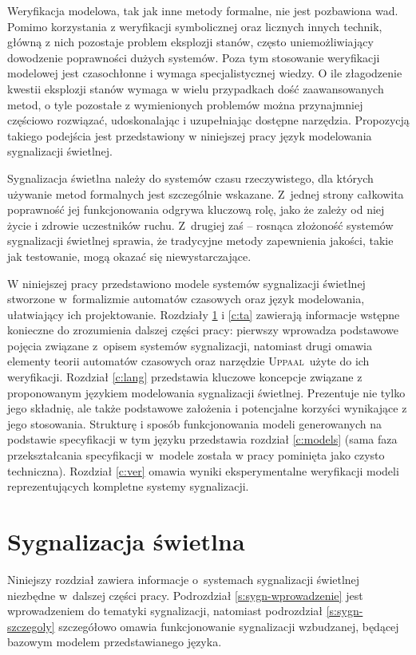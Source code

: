 \documentclass{pracamgr}
\newcommand{\upp}{\textsc{Uppaal}}
\theoremstyle{plain}
\begin{document}
Weryfikacja modelowa, tak jak inne metody formalne, nie jest
pozbawiona wad. Pomimo korzystania z weryfikacji symbolicznej oraz
licznych innych technik, główną z nich pozostaje problem eksplozji
stanów, często uniemożliwiający dowodzenie poprawności dużych
systemów. Poza tym stosowanie weryfikacji modelowej jest czasochłonne
i wymaga specjalistycznej wiedzy. O ile złagodzenie kwestii eksplozji
stanów wymaga w wielu przypadkach dość zaawansowanych metod, o tyle
pozostałe z wymienionych problemów można przynajmniej częściowo
rozwiązać, udoskonalając i uzupełniając dostępne narzędzia. Propozycją
takiego podejścia jest przedstawiony w niniejszej pracy język modelowania
sygnalizacji świetlnej.

Sygnalizacja świetlna należy do systemów czasu rzeczywistego, dla
których używanie metod formalnych jest szczególnie wskazane. Z~jednej
strony całkowita poprawność jej funkcjonowania odgrywa kluczową rolę,
jako że zależy od niej życie i zdrowie uczestników ruchu. Z~drugiej
zaś -- rosnąca złożoność systemów sygnalizacji świetlnej sprawia, że
tradycyjne metody zapewnienia jakości, takie jak testowanie, mogą
okazać się niewystarczające.

W niniejszej pracy przedstawiono modele systemów sygnalizacji
świetlnej stworzone w~formalizmie automatów czasowych oraz język
modelowania, ułatwiający ich projektowanie.  Rozdziały \ref{c:signals}
i \ref{c:ta} zawierają informacje wstępne konieczne do zrozumienia
dalszej części pracy: pierwszy wprowadza podstawowe pojęcia związane
z~opisem systemów sygnalizacji, natomiast drugi omawia elementy teorii
automatów czasowych oraz narzędzie \upp\ użyte do ich weryfikacji.
Rozdział \ref{c:lang} przedstawia kluczowe koncepcje związane z
proponowanym językiem modelowania sygnalizacji świetlnej. Prezentuje
nie tylko jego składnię, ale także podstawowe założenia i potencjalne
korzyści wynikające z jego stosowania. Strukturę i sposób
funkcjonowania modeli generowanych na podstawie specyfikacji w tym
języku przedstawia rozdział \ref{c:models} (sama faza przekształcania
specyfikacji w~modele została w pracy pominięta jako czysto
techniczna). Rozdział \ref{c:ver} omawia wyniki eksperymentalne
weryfikacji modeli reprezentujących kompletne systemy sygnalizacji.

\chapter{Sygnalizacja świetlna}
\label{c:signals}

Niniejszy rozdział zawiera informacje o~systemach sygnalizacji
świetlnej niezbędne w~dalszej części pracy. Podrozdział
\ref{s:sygn-wprowadzenie} jest wprowadzeniem do tematyki sygnalizacji,
natomiast podrozdział \ref{s:sygn-szczegoly} szczegółowo omawia
funkcjonowanie sygnalizacji wzbudzanej, będącej bazowym modelem
przedstawianego języka.
\end{document}
